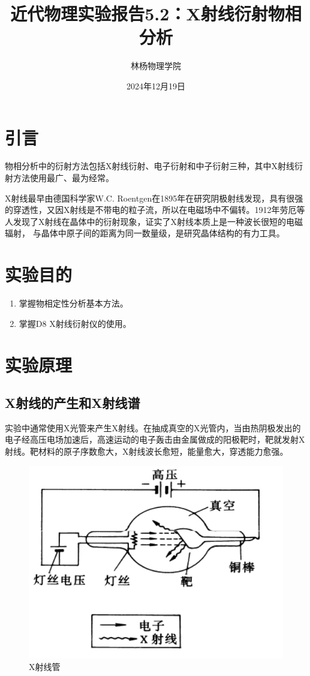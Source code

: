 \documentclass[a4paper]{article}
\title{近代物理实验报告5.2：X射线衍射物相分析}
\author{林杨\quad 211840092\quad 物理学院}
\date{2024年12月19日}
\begin{document}
\maketitle


\section{引言}
物相分析中的衍射方法包括X射线衍射、电子衍射和中子衍射三种，其中X射线衍射方法使用最广、最为经常。

X射线最早由德国科学家W.C. Roentgen在1895年在研究阴极射线发现，具有很强的穿透性，又因X射线是不带电的粒子流，所以在电磁场中不偏转。1912年劳厄等人发现了X射线在晶体中的衍射现象，证实了X射线本质上是一种波长很短的电磁辐射，
与晶体中原子间的距离为同一数量级，是研究晶体结构的有力工具。
\section{实验目的}
\begin{enumerate}
\item 掌握物相定性分析基本方法。
\item 掌握D8 X射线衍射仪的使用。
\end{enumerate}


\section{实验原理}

\subsection{X射线的产生和X射线谱}
实验中通常使用X光管来产生X射线。在抽成真空的X光管内，当由热阴极发出的电子经高压电场加速后，高速运动的电子轰击由金属做成的阳极靶时，靶就发射X射线。靶材料的原子序数愈大，X射线波长愈短，能量愈大，穿透能力愈强。
\begin{figure}[H]
	\centering
	\includegraphics[width=0.5\linewidth]{fig/X1.jpg}
	\caption{X射线管}
\end{figure}
\end{document}

